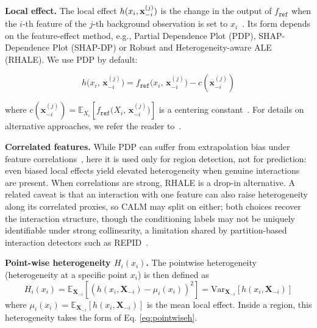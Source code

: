 \textbf{Local effect.}
The local effect $h(x_i , \mathbf{x}_{-i}^{(j)})$ is the change in the output of $f_{\mathtt{ref}}$ when the $i$-th feature of the $j$-th background observation is set to $x_i$~\cite{goldstein2015peeking}.
Its form depends on the feature-effect method, e.g., Partial Dependence Plot (PDP), SHAP-Dependence Plot (SHAP-DP) or Robust and Heterogeneity-aware ALE (RHALE).
We use PDP by default:

\begin{equation}
h\bigl(x_i,\,\mathbf{x}_{-i}^{(j)}\bigr) = 
f_{\mathtt{ref}}\bigl(x_i,\,\mathbf{x}_{-i}^{(j)}\bigr)
- c(\mathbf{x}^{(j)}_{-i})
\end{equation}

where $c(\mathbf{x}^{(j)}_{-i})= \mathbb{E}_{X_i} \left [ f_{\mathtt{ref}}\bigl(X_i,\,\mathbf{x}_{-i}^{(j)}\bigr) \right ]$ is a centering constant~\cite{herbinger2024GADGET}.
For details on alternative approaches, we refer the reader to~\cite{herbinger2024GADGET, herbinger2022REPID}.

\textbf{Correlated features.}
While PDP can suffer from extrapolation bias under feature correlations~\cite{molnar2022general, molnar2024model}, here it is used only for region detection, not for prediction: even biased local effects yield elevated heterogeneity when genuine interactions are present. When correlations are strong, RHALE \citep{gkolemis2023rhale} is a drop-in alternative. A related caveat is that an interaction with one feature can also raise heterogeneity along its correlated proxies, so CALM may split on either; both choices recover the interaction structure, though the conditioning labels may not be uniquely identifiable under strong collinearity, a limitation shared by partition-based interaction detectors such as REPID~\cite{herbinger2022REPID}.

\textbf{Point-wise heterogeneity $H_i(x_i)$.}
The pointwise heterogeneity (heterogeneity at a specific point $x_i$)
is then defined as 
\begin{equation}
H_i(x_i) = \mathbb{E}_{\mathbf{X}_{-i}}\left[\left(h(x_i, \mathbf{X}_{-i}) - \mu_i(x_i)\right)^2\right] = \text{Var}_{\mathbf{X}_{-i}}\left[h(x_i, \mathbf{X}_{-i})\right]
\end{equation}
where $\mu_i(x_i) = \mathbb{E}_{\mathbf{X}_{-i}}[h(x_i, \mathbf{X}_{-i})]$ is the mean local effect. Inside a region, this heterogeneity takes the form of Eq. \eqref{eq:pointwiseh}.

